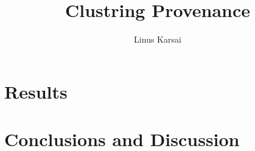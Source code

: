 \documentclass[BIT, graphvis, a4paper]{usydthesis}
\title{Clustring Provenance}
\begin{document}
\author{Linus Karsai}

\maketitle
\tableofcontents
\newpage\setcounter{page}{1}






\chapter{Results} %

\chapter{Conclusions and Discussion} %







\end{document}
